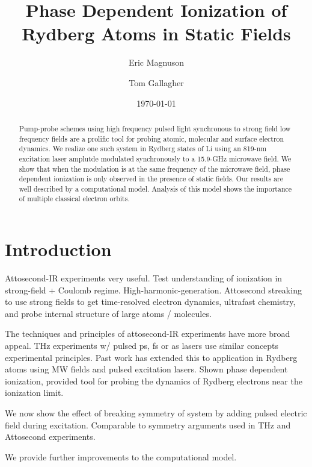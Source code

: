 \documentclass[aps,pra,preprint,groupedaddress]{revtex4-1}
\begin{document}
\title{Phase Dependent Ionization of Rydberg Atoms in Static Fields}

\author{Eric Magnuson}
\author{Tom Gallagher}

\date{\today}

\begin{abstract}
Pump-probe schemes using high frequency pulsed light synchronous to strong field low frequency fields are a prolific tool for probing atomic, molecular and surface electron dynamics. We realize one such system in Rydberg states of Li using an 819-nm excitation laser amplutde modulated synchronously to a 15.9-GHz microwave field. We show that when the modulation is at the same frequency of the microwave field, phase dependent ionization is only observed in the presence of static fields. Our results are well described by a computational model. Analysis of this model shows the importance of multiple classical electron orbits.
\end{abstract}

\maketitle

\section{\label{sec:intro}Introduction}

Attosecond-IR experiments very useful. Test understanding of ionization in strong-field + Coulomb regime. High-harmonic-generation. Attosecond streaking to use strong fields to get time-resolved electron dynamics, ultrafast chemistry, and probe internal structure of large atoms / molecules.

The techniques and principles of attosecond-IR experiments have more broad appeal. THz experiments w/ pulsed ps, fs or as lasers use similar concepts experimental principles. Past work has extended this to application in Rydberg atoms using MW fields and pulsed excitation lasers. Shown phase dependent ionization, provided tool for probing the dynamics of Rydberg electrons near the ionization limit.

We now show the effect of breaking symmetry of system by adding pulsed electric field during excitation. Comparable to symmetry arguments used in THz and Attosecond experiments.

We provide further improvements to the computational model.
\end{document}
